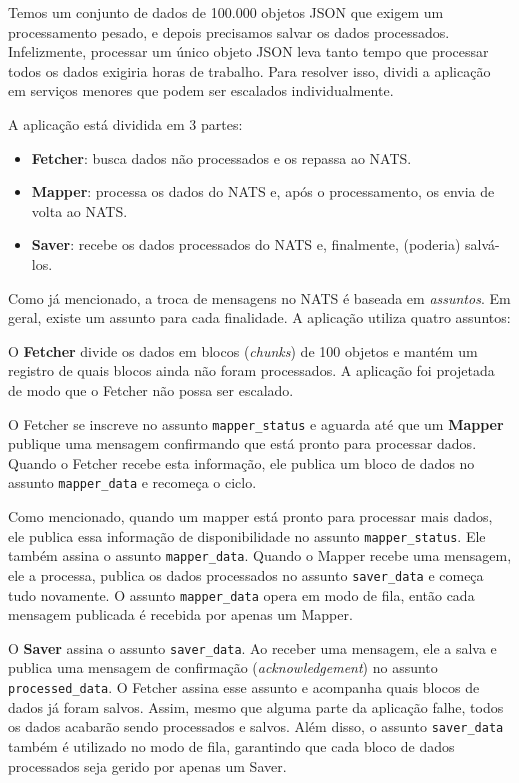 \documentclass[11pt,a4paper]{article}
\begin{document}
Temos um conjunto de dados de 100.000 objetos JSON que exigem um processamento pesado, e depois precisamos salvar os dados processados. Infelizmente, processar um único objeto JSON leva tanto tempo que processar todos os dados exigiria horas de trabalho. Para resolver isso, dividi a aplicação em serviços menores que podem ser escalados individualmente.

A aplicação está dividida em 3 partes:
\begin{itemize}
    \item \textbf{Fetcher}: busca dados não processados e os repassa ao NATS.
    \item \textbf{Mapper}: processa os dados do NATS e, após o processamento, os envia de volta ao NATS.
    \item \textbf{Saver}: recebe os dados processados do NATS e, finalmente, (poderia) salvá-los.
\end{itemize}

Como já mencionado, a troca de mensagens no NATS é baseada em \textit{assuntos}. Em geral, existe um assunto para cada finalidade. A aplicação utiliza quatro assuntos:

O \textbf{Fetcher} divide os dados em blocos (\textit{chunks}) de 100 objetos e mantém um registro de quais blocos ainda não foram processados. A aplicação foi projetada de modo que o Fetcher não possa ser escalado.

O Fetcher se inscreve no assunto \texttt{mapper\_status} e aguarda até que um \textbf{Mapper} publique uma mensagem confirmando que está pronto para processar dados. Quando o Fetcher recebe esta informação, ele publica um bloco de dados no assunto \texttt{mapper\_data} e recomeça o ciclo.

Como mencionado, quando um mapper está pronto para processar mais dados, ele publica essa informação de disponibilidade no assunto \texttt{mapper\_status}. Ele também assina o assunto \texttt{mapper\_data}. Quando o Mapper recebe uma mensagem, ele a processa, publica os dados processados no assunto \texttt{saver\_data} e começa tudo novamente. O assunto \texttt{mapper\_data} opera em modo de fila, então cada mensagem publicada é recebida por apenas um Mapper.

O \textbf{Saver} assina o assunto \texttt{saver\_data}. Ao receber uma mensagem, ele a salva e publica uma mensagem de confirmação (\textit{acknowledgement}) no assunto \texttt{processed\_data}. O Fetcher assina esse assunto e acompanha quais blocos de dados já foram salvos. Assim, mesmo que alguma parte da aplicação falhe, todos os dados acabarão sendo processados e salvos. Além disso, o assunto \texttt{saver\_data} também é utilizado no modo de fila, garantindo que cada bloco de dados processados seja gerido por apenas um Saver.
\end{document}
